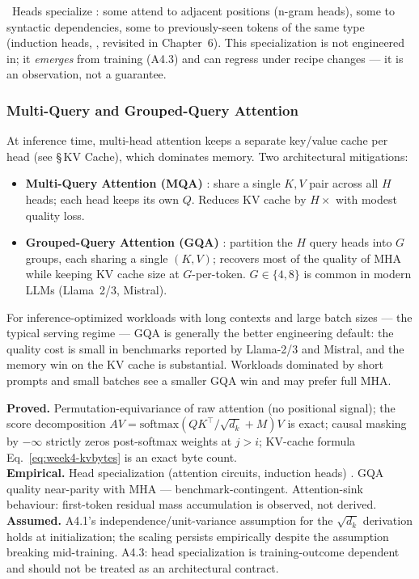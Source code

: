 \Emp\ Heads specialize \citep{elhage2021mathematical}: some attend to
adjacent positions (n-gram heads), some to syntactic dependencies,
some to previously-seen tokens of the same type (induction heads,
\citealt{olsson2022induction}, revisited in Chapter~6). This
specialization is not engineered in; it \emph{emerges} from training
(A4.3) and can regress under recipe changes --- it is an observation,
not a guarantee.

\subsubsection{Multi-Query and Grouped-Query Attention}

At inference time, multi-head attention keeps a separate key/value
cache per head (see \S\,KV Cache), which dominates memory. Two
architectural mitigations:
\begin{itemize}
  \item \textbf{Multi-Query Attention (MQA)} \citep{shazeer2019fast}:
        share a single $K, V$ pair across all $H$ heads; each head
        keeps its own $Q$. Reduces KV cache by $H\times$ with modest
        quality loss.
  \item \textbf{Grouped-Query Attention (GQA)}
        \citep{ainslie2023gqa}: partition the $H$ query heads into
        $G$ groups, each sharing a single $(K, V)$; recovers most of
        the quality of MHA while keeping KV cache size at $G$-per-token.
        $G \in \{4, 8\}$ is common in modern LLMs (Llama~2/3, Mistral).
\end{itemize}
For inference-optimized workloads with long contexts and large
batch sizes --- the typical serving regime --- GQA is generally
the better engineering default: the quality cost is small in
benchmarks reported by Llama-2/3 and Mistral, and the memory win
on the KV cache is substantial. Workloads dominated by short
prompts and small batches see a smaller GQA win and may prefer
full MHA.

\begin{provedassumed}
\textbf{Proved.} Permutation-equivariance of raw attention (no
positional signal); the score decomposition
$A V = \mathrm{softmax}(QK^{\top}/\sqrt{d_k} + M) V$ is exact;
causal masking by $-\infty$ strictly zeros post-softmax weights at
$j > i$; KV-cache formula Eq.~\eqref{eq:week4-kvbytes} is an exact
byte count. \\
\textbf{Empirical.} Head specialization (attention circuits,
induction heads) \citep{elhage2021mathematical, olsson2022induction}.
GQA quality near-parity with MHA \citep{ainslie2023gqa} ---
benchmark-contingent. Attention-sink behaviour: first-token
residual mass accumulation is observed, not derived. \\
\textbf{Assumed.} A4.1's independence/unit-variance assumption for
the $\sqrt{d_k}$ derivation holds at initialization; the scaling
persists empirically despite the assumption breaking mid-training.
A4.3: head specialization is training-outcome dependent and should
not be treated as an architectural contract.
\end{provedassumed}

